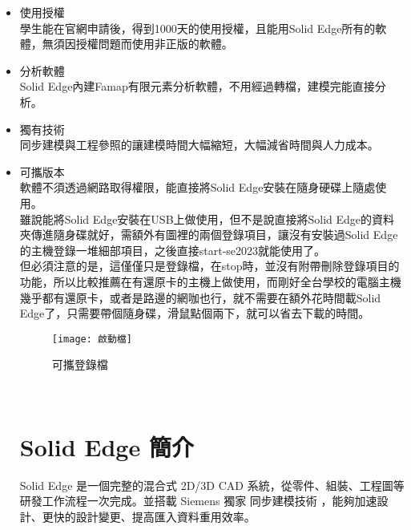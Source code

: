 \begin{itemize}
\item 使用授權\\

\qquad 學生能在官網申請後，得到1000天的使用授權，且能用Solid Edge所有的軟體，無須因授權問題而使用非正版的軟體。\\

\item 分析軟體\\

\qquad Solid Edge內建Famap有限元素分析軟體，不用經過轉檔，建模完能直接分析。\\

\item 獨有技術\\

\qquad 同步建模與工程參照的讓建模時間大幅縮短，大幅減省時間與人力成本。\\

\item 可攜版本\\

\qquad 軟體不須透過網路取得權限，能直接將Solid Edge安裝在隨身硬碟上隨處使用。\\

\qquad 雖說能將Solid Edge安裝在USB上做使用，但不是說直接將Solid Edge的資料夾傳進隨身碟就好，需額外有圖裡的兩個登錄項目，讓沒有安裝過Solid Edge的主機登錄一堆細部項目，之後直接start-se2023就能使用了。\\

\qquad 但必須注意的是，這僅僅只是登錄檔，在stop時，並沒有附帶刪除登錄項目的功能，所以比較推薦在有還原卡的主機上做使用，而剛好全台學校的電腦主機幾乎都有還原卡，或者是路邊的網咖也行，就不需要在額外花時間載Solid Edge了，只需要帶個隨身碟，滑鼠點個兩下，就可以省去下載的時間。\\
\begin{figure}[hbt!]
\begin{center}
\texttt{[image: 啟動檔]}
\caption{\Large 可攜登錄檔}\label{0.1}
\end{center}
\end{figure}
\\
\section{Solid Edge 簡介}

\qquad Solid Edge 是一個完整的混合式 2D/3D CAD 系統，從零件、組裝、工程圖等研發工作流程一次完成。並搭載 Siemens 獨家 同步建模技術 ，能夠加速設計、更快的設計變更、提高匯入資料重用效率。\\


\end{itemize}
